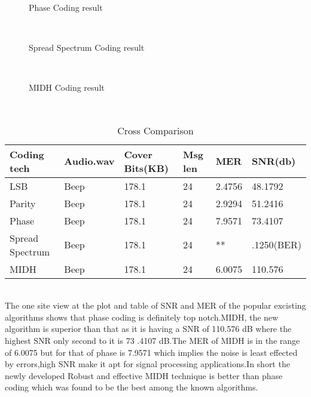 \documentclass[a4paper, 12pt, notitlepage]{report}
\begin{document}
\begin{figure}[h!]
{\par}
\caption{Phase Coding result}
\end{figure}\\

\begin{figure}[h!]
{\par}
\caption{Spread Spectrum Coding result}
\end{figure}\\

\begin{figure}[h!]
{\par}
\caption{MIDH Coding result}
\end{figure}\\


\begin{table}[h]
\begin{tabular}{|l|l|l|l|l|l|}
\hline
\textbf{Coding tech}&\textbf{Audio.wav}&\textbf{Cover Bits(KB)}&\textbf{Msg len}&\textbf{MER}&\textbf{SNR(db)} \\ \hline
 LSB&Beep&178.1  &24  &2.4756  &48.1792\\ \hline
 Parity&Beep&178.1  &24  &2.9294  &51.2416 \\ \hline
 Phase&Beep&178.1  &24  &7.9571  &73.4107\\ \hline
Spread Spectrum&Beep&178.1&24&**&.1250(BER)\\ \hline
MIDH&Beep&178.1&24&6.0075&110.576\\ \hline
\end{tabular}
\caption{Cross Comparison}
\end{table}\\

The one site view at the plot and table of SNR and MER of the popular excisting algorithms shows that phase coding is definitely top notch.MIDH, the new algorithm is superior than that as it is having a SNR of 110.576 dB where the highest SNR only second to it is 73
.4107 dB.The MER of MIDH is in the range of 6.0075 but for that of phase is 7.9571 which implies the noise is least effected by errors,high SNR make it apt for signal processing applications.In short the newly developed Robust and effective MIDH technique is better than phase coding which was found to be the best among the known algorithms.\\  
\end{document}
